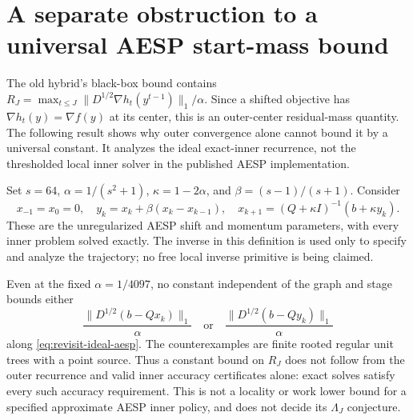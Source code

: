 \section{A separate obstruction to a universal AESP start-mass bound}
\label{sec:revisit-exact-aesp-mass}
The old hybrid's black-box bound contains
$R_J=\max_{t\leq J}\|D^{1/2}\nabla h_t(y^{t-1})\|_1/\alpha$.
Since a shifted objective has $\nabla h_t(y)=\nabla f(y)$ at its center,
this is an outer-center residual-mass quantity. The following result
shows why outer convergence alone cannot bound it by a universal constant.
It analyzes the ideal exact-inner recurrence, not the thresholded local
inner solver in the published AESP implementation.

Set $s=64$, $\alpha=1/(s^2+1)$, $\kappa=1-2\alpha$, and
$\beta=(s-1)/(s+1)$. Consider
\begin{equation}
 x_{-1}=x_0=0,\quad y_k=x_k+\beta(x_k-x_{k-1}),\quad
 x_{k+1}=(Q+\kappa I)^{-1}(b+\kappa y_k).
 \label{eq:revisit-ideal-aesp}
\end{equation}
These are the unregularized AESP shift and momentum parameters, with
every inner problem solved exactly. The inverse in this definition is
used only to specify and analyze the trajectory; no free local inverse
primitive is being claimed.

\begin{theorem}
\label{thm:revisit-exact-aesp-mass}
Even at the fixed $\alpha=1/4097$, no constant independent of the graph
and stage bounds either
\[
 \frac{\|D^{1/2}(b-Qx_k)\|_1}{\alpha}
 \quad\text{or}\quad
 \frac{\|D^{1/2}(b-Qy_k)\|_1}{\alpha}
\]
along \cref{eq:revisit-ideal-aesp}. The counterexamples are finite rooted
regular unit trees with a point source. Thus a constant bound on $R_J$
does not follow from the outer recurrence and valid inner accuracy
certificates alone: exact solves satisfy every such accuracy requirement.
This is not a locality or work lower bound for a specified approximate
AESP inner policy, and does not decide its $\Lambda_J$ conjecture.
\end{theorem}

